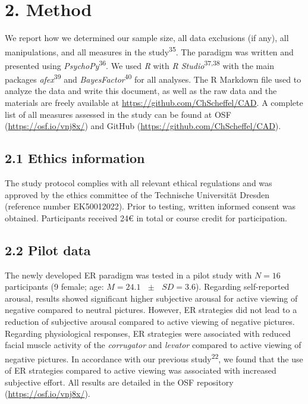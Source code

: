 \documentclass[
  man,floatsintext]{apa6}
\begin{document}
\hypertarget{method}{%
\section{2. Method}\label{method}}

We report how we determined our sample size, all data exclusions (if any), all manipulations, and all measures in the study\textsuperscript{35}.
The paradigm was written and presented using \emph{PsychoPy}\textsuperscript{36}.
We used \emph{R} with \emph{R Studio}\textsuperscript{37,38} with the main packages \emph{afex}\textsuperscript{39} and \emph{BayesFactor}\textsuperscript{40} for all analyses.
The R Markdown file used to analyze the data and write this document, as well as the raw data and the materials are freely available at \url{https://github.com/ChScheffel/CAD}.
A complete list of all measures assessed in the study can be found at OSF (\url{https://osf.io/vnj8x/}) and GitHub (\url{https://github.com/ChScheffel/CAD}).

\hypertarget{ethics-information}{%
\subsection{2.1 Ethics information}\label{ethics-information}}

The study protocol complies with all relevant ethical regulations and was approved by the ethics committee of the Technische Universität Dresden (reference number EK50012022).
Prior to testing, written informed consent was obtained.
Participants received 24€ in total or course credit for participation.

\hypertarget{pilot-data}{%
\subsection{2.2 Pilot data}\label{pilot-data}}

The newly developed ER paradigm was tested in a pilot study with \(N=16\) participants (9 female; age: \(M = 24.1\text{ }\pm\text{ }SD = 3.6\)).
Regarding self-reported arousal, results showed significant higher subjective arousal for active viewing of negative compared to neutral pictures.
However, ER strategies did not lead to a reduction of subjective arousal compared to active viewing of negative pictures.
Regarding physiological responses, ER strategies were associated with reduced facial muscle activity of the \emph{corrugator} and \emph{levator} compared to active viewing of negative pictures.
In accordance with our previous study\textsuperscript{22}, we found that the use of ER strategies compared to active viewing was associated with increased subjective effort.
All results are detailed in the OSF repository (\url{https://osf.io/vnj8x/}).
\end{document}
